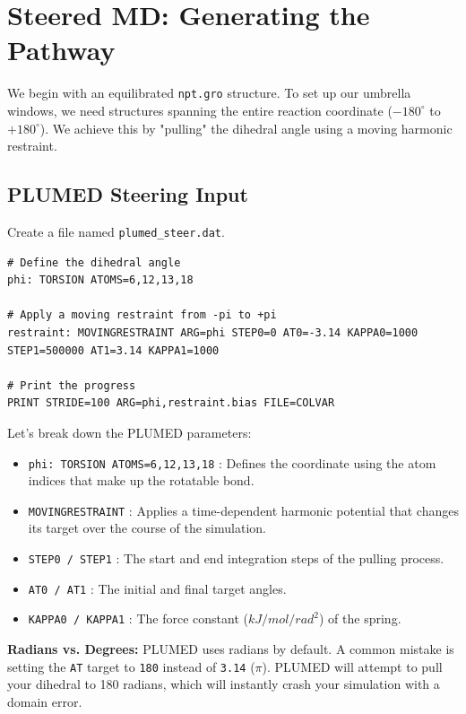 \documentclass[12pt, a4paper]{article}
\begin{document}
\section{Steered MD: Generating the Pathway}
We begin with an equilibrated \texttt{npt.gro} structure. To set up our umbrella windows, we need structures spanning the entire reaction coordinate ($-180^\circ$ to $+180^\circ$). We achieve this by "pulling" the dihedral angle using a moving harmonic restraint.

\subsection{PLUMED Steering Input}
Create a file named \texttt{plumed\_steer.dat}. 

\begin{lstlisting}[title={\textbf{plumed\_steer.dat}}]
# Define the dihedral angle
phi: TORSION ATOMS=6,12,13,18

# Apply a moving restraint from -pi to +pi
restraint: MOVINGRESTRAINT ARG=phi STEP0=0 AT0=-3.14 KAPPA0=1000 STEP1=500000 AT1=3.14 KAPPA1=1000

# Print the progress
PRINT STRIDE=100 ARG=phi,restraint.bias FILE=COLVAR
\end{lstlisting}

\begin{syntaxbox}
Let's break down the PLUMED parameters:
\begin{itemize}
    \item \texttt{phi: TORSION ATOMS=6,12,13,18} : Defines the coordinate using the atom indices that make up the rotatable bond.
    \item \texttt{MOVINGRESTRAINT} : Applies a time-dependent harmonic potential that changes its target over the course of the simulation.
    \item \texttt{STEP0 / STEP1} : The start and end integration steps of the pulling process.
    \item \texttt{AT0 / AT1} : The initial and final target angles.
    \item \texttt{KAPPA0 / KAPPA1} : The force constant ($kJ/mol/rad^2$) of the spring.
\end{itemize}
\end{syntaxbox}

\begin{gotcha}
\textbf{Radians vs. Degrees:} PLUMED uses radians by default. A common mistake is setting the \texttt{AT} target to \texttt{180} instead of \texttt{3.14} ($\pi$). PLUMED will attempt to pull your dihedral to 180 radians, which will instantly crash your simulation with a domain error.
\end{gotcha}
\end{document}
